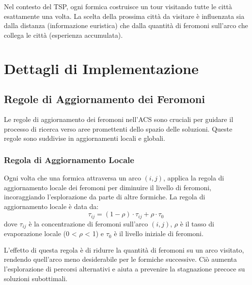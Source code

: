 Nel contesto del \gls{TSP}, ogni formica costruisce un tour visitando tutte le città esattamente una volta. La scelta della prossima città da visitare è influenzata sia dalla distanza (informazione euristica) che dalla quantità di feromoni sull'arco che collega le città (esperienza accumulata).

\section{Dettagli di Implementazione}

\subsection{Regole di Aggiornamento dei Feromoni}

Le regole di aggiornamento dei feromoni nell'\gls{ACS} sono cruciali per guidare il processo di ricerca verso aree promettenti dello spazio delle soluzioni. Queste regole sono suddivise in aggiornamenti locali e globali.

\subsubsection{Regola di Aggiornamento Locale}
Ogni volta che una formica attraversa un arco $(i,j)$, applica la regola di aggiornamento locale dei feromoni per diminuire il livello di feromoni, incoraggiando l'esplorazione da parte di altre formiche. La regola di aggiornamento locale è data da:
\[
	\tau_{ij} = (1 - \rho) \cdot \tau_{ij} + \rho \cdot \tau_0
\]
dove $\tau_{ij}$ è la concentrazione di feromoni sull'arco $(i,j)$, $\rho$ è il tasso di evaporazione locale (0 < $\rho$ < 1) e $\tau_0$ è il livello iniziale di feromoni.

L'effetto di questa regola è di ridurre la quantità di feromoni su un arco visitato, rendendo quell'arco meno desiderabile per le formiche successive. Ciò aumenta l'esplorazione di percorsi alternativi e aiuta a prevenire la stagnazione precoce su soluzioni subottimali.

